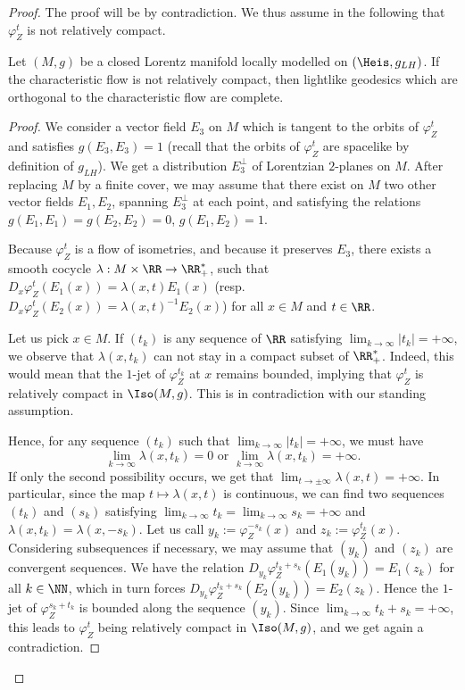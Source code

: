 \begin{proof}
The proof will be by contradiction. We thus assume in the following that ${\varphi}_Z^t$ is not relatively compact.

\begin{lemm}\label{lem.lightlike.complete}
Let $(M,g)$ be a closed Lorentz manifold locally modelled on $(\Heis,g_{LH})$. If the characteristic flow is not relatively compact, then lightlike geodesics which are orthogonal to the characteristic flow are complete.
\end{lemm}

\begin{proof}
We consider a vector field $E_3$ on $M$ which is tangent to the orbits of ${\varphi}_Z^t$ and satisfies $g(E_3,E_3)=1$ (recall that the orbits of ${\varphi}_Z^t$ are spacelike by definition of $g_{LH}$). We get a distribution $E_3^{\perp}$ of Lorentzian $2$-planes on $M$. After replacing $M$ by a finite cover, we may assume that there exist on $M$ two other vector fields $E_1,E_2$, spanning $E_3^{\perp}$ at each point, and satisfying the relations $g(E_1,E_1)=g(E_2,E_2)=0$, $g(E_1,E_2)=1$.

Because ${\varphi}_Z^t$ is a flow of isometries, and because it preserves $E_3$, there exists a smooth cocycle $\lambda: M \times \RR \to \RR_+^*$, such that $D_{x}\varphi_Z^{t}(E_1(x))= \lambda(x,t) E_1(x)$ (resp.~$D_{x}\varphi_Z^{t}(E_2(x))= \lambda(x,t)^{-1} E_2(x)$) for all $x \in M$ and $t \in \RR$.

Let us pick $x \in M$. If $(t_k)$ is any sequence of $\RR$ satisfying $\lim_{k \to \infty}|t_k|=+\infty$, we observe that $\lambda(x,t_k)$ can not stay in a compact subset of $\RR_+^*$. Indeed, this would mean that the $1$-jet of $\varphi_Z^{t_k}$ at $x$ remains bounded, implying that ${\varphi}_Z^t$ is relatively compact in $\Iso(M,g)$. This is in contradiction with our standing assumption.

Hence, for any sequence $(t_k)$ such that $\lim_{k \to \infty}|t_k|=+\infty$, we must have
\[
\lim_{k \to \infty}\lambda(x,t_k)=0 \text{ or } \lim_{k \to \infty}\lambda(x,t_k)=+ \infty.
\]
If only the second possibility occurs, we get that $\lim_{t \to \pm \infty} \lambda(x,t)= + \infty$. In particular, since the map $t \mapsto \lambda(x,t)$ is continuous, we can find two sequences $(t_k)$ and $(s_k)$ satisfying $\lim_{k \to \infty} t_k =\lim_{k \to \infty} s_k =+ \infty$ and $\lambda(x,t_k)=\lambda(x, -s_k)$. Let us call $y_k:={\varphi}_Z^{-s_k}(x)$ and $z_k:={\varphi}_Z^{t_k}(x)$. Considering subsequences if necessary, we may assume that $(y_k)$ and $(z_k)$ are convergent sequences. We have the relation $D_{y_k}{\varphi}_Z^{t_k+s_k}(E_1(y_k))=E_1(z_k)$ for all $k \in \NN$, which in turn forces $D_{y_k}{\varphi}_Z^{t_k+s_k}(E_2(y_k))=E_2(z_k)$. Hence the $1$-jet of $\varphi_Z^{s_k+t_k}$ is bounded along the sequence $(y_k)$. Since $\lim_{k \to \infty} t_k+s_k=+ \infty$, this leads to ${\varphi}_Z^t$ being relatively compact in $\Iso(M,g)$, and we get again a contradiction.


\end{proof}
\end{proof}
